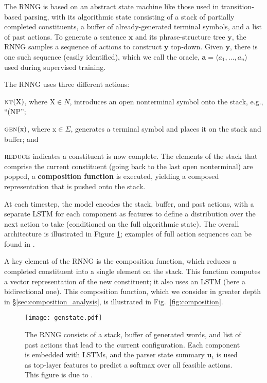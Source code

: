 \documentclass[11pt]{article}
\newenvironment{itemizesquish}{\begin{list}{\setcounter{enumi}{0}\labelitemi}{\setlength{\itemsep}{-0.25em}\setlength{\labelwidth}{0.5em}\setlength{\leftmargin}{\labelwidth}\addtolength{\leftmargin}{\labelsep}}}{\end{list}}
\begin{document}
The RNNG is based on an abstract state machine like those used in transition-based parsing, with its algorithmic state consisting of a stack of partially completed constituents, a buffer of already-generated terminal symbols, and a list of past actions. To generate a sentence $\boldsymbol{x}$ and its phrase-structure tree $\boldsymbol{y}$, the RNNG samples a sequence of actions to construct $\boldsymbol{y}$ top-down. Given $\boldsymbol{y}$, there is one such sequence (easily identified), which we call the oracle, $\boldsymbol{a} = \langle a_1,\ldots,a_n \rangle$ used during supervised training.

The RNNG uses three different actions:
\begin{itemizesquish}
\item $\textsc{nt}(\mathrm{X})$, where $\mathrm{X} \in N$, introduces an open nonterminal symbol onto the stack, e.g., ``(NP'';
\item $\textsc{gen}(\mathrm{x})$, where $\mathrm{x} \in \Sigma$, generates a terminal symbol and places it on the stack and buffer; and
\item $\textsc{reduce}$ indicates a constituent is now complete.  The elements of the stack that comprise the current constituent (going back to the last open nonterminal) are popped, a \textbf{composition function} is executed, yielding a composed representation that is pushed onto the stack.
\end{itemizesquish}

At each timestep, the model encodes the stack, buffer, and past actions, with a separate LSTM \cite{hochreiter_97} for each component as features to define a distribution over the next action to take (conditioned on the full algorithmic state).  
The overall architecture is illustrated in Figure \ref{fig:genstate}; examples of full action sequences can be found in .

A key element of the RNNG is the composition function, which reduces a completed constituent into a single element on the stack.  This function computes a vector representation of the new constituent; it also uses an LSTM (here a bidirectional one).  This composition function, which we consider in greater depth in \S\ref{sec:composition_analysis}, is illustrated in Fig.~\ref{fig:composition}.


\begin{figure}
\centering
\vspace{-.2cm}\texttt{[image: genstate.pdf]}
\vspace{-.7cm}\caption{The RNNG consists of a stack, buffer of generated words, and list of past actions that lead to the current configuration. Each component is embedded with LSTMs, and the parser state summary $\mathbf{u}_t$ is used as top-layer features to predict a softmax over all feasible actions. This figure is due to .
\label{fig:genstate}}
\end{figure}
\end{document}
